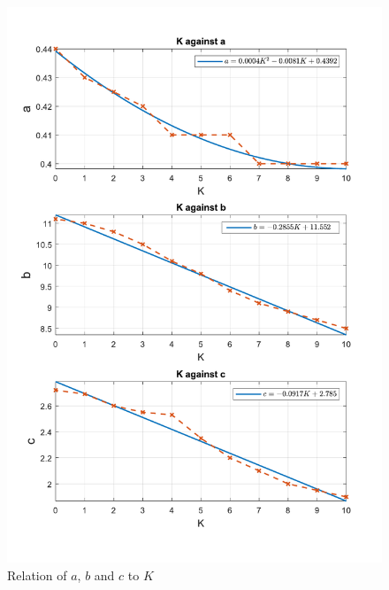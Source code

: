 \begin{figure}
	\centering
	\includegraphics[width=\textwidth]{Graphics/Methodology/KcoeffFit.pdf}
	\caption{Relation of \(a\), \(b\) and \(c\) to \(K\)}
	\label{fig:findKcoeff}
\end{figure}
